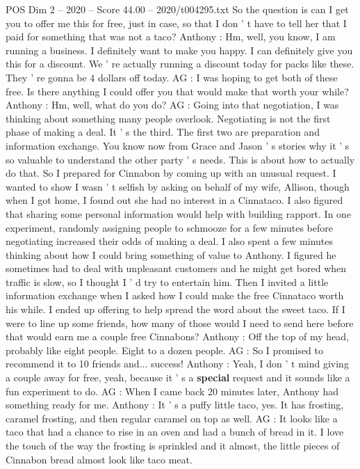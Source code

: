 \begin{textsample}{POS Dim 2 – 2020 – Score 44.00 – 2020/t004295.txt}
So the question is can I get you to offer me this for free, just in case, so that I don ' t have to tell her that I paid for something that was not a taco?
Anthony : Hm, well, you know, I am running a business.
I definitely want to make you happy.
I can definitely give you this for a discount.
We ' re actually running a discount today for packs like these.
They ' re gonna be 4 dollars off today.
AG : I was hoping to get both of these free.
Is there anything I could offer you that would make that worth your while?
Anthony : Hm, well, what do you do?
AG : Going into that negotiation, I was thinking about something many people overlook.
Negotiating is not the first phase of making a deal.
It ' s the third.
The first two are preparation and information exchange.
You know now from Grace and Jason ' s stories why it ' s so valuable to understand the other party ' s needs.
This is about how to actually do that.
So I prepared for Cinnabon by coming up with an unusual request.
I wanted to show I wasn ' t selfish by asking on behalf of my wife, Allison, though when I got home, I found out she had no interest in a Cinnataco.
I also figured that sharing some personal information would help with building rapport.
In one experiment, randomly assigning people to schmooze for a few minutes before negotiating increased their odds of making a deal.
I also spent a few minutes thinking about how I could bring something of value to Anthony.
I figured he sometimes had to deal with unpleasant customers and he might get bored when traffic is slow, so I thought I ' d try to entertain him.
Then I invited a little information exchange when I asked how I could make the free Cinnataco worth his while.
I ended up offering to help spread the word about the sweet taco.
If I were to line up some friends, how many of those would I need to send here before that would earn me a couple free Cinnabons?
Anthony : Off the top of my head, probably like eight people.
Eight to a dozen people.
AG : So I promised to recommend it to 10 friends and... success!
Anthony : Yeah, I don ' t mind giving a couple away for free, yeah, because it ' s a \textbf{special} request and it sounds like a fun experiment to do.
AG : When I came back 20 minutes later, Anthony had something ready for me.
Anthony : It ' s a puffy little taco, yes.
It has frosting, caramel frosting, and then regular caramel on top as well.
AG : It looks like a taco that had a chance to rise in an oven and had a bunch of bread in it.
I love the touch of the way the frosting is sprinkled and it almost, the little pieces of Cinnabon bread almost look like taco meat.

\end{textsample}
